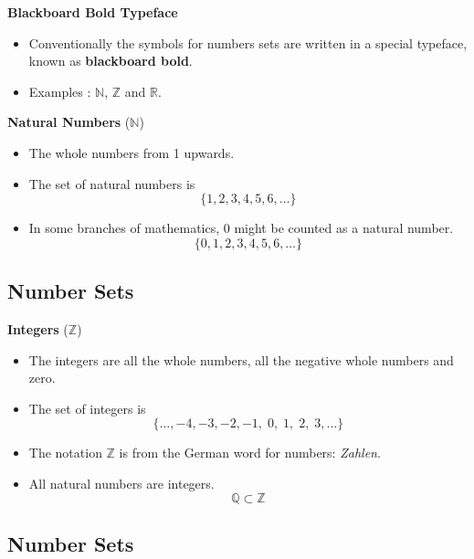 \documentclass[]{report}
\begin{document}
\textbf{Blackboard Bold Typeface}

\begin{itemize}
\item Conventionally the symbols for numbers sets are written in a special typeface, known as \textbf{blackboard bold}.
\item Examples : $\mathbb{N}$, $\mathbb{Z}$ and $\mathbb{R}$.

\end{itemize}


\textbf{Natural Numbers} ($\mathbb{N}$)
\begin{itemize}
\item The whole numbers from 1 upwards. 

\item The set of natural numbers is 
\[\{1,2,3,4,5,6,\ldots\} \]
\item In some branches of mathematics, $0$ might be counted as a natural number.
\[\{0,1,2,3,4,5,6,\ldots\} \]
\end{itemize}



\subsection{Number Sets}


\textbf{Integers} ($\mathbb{Z}$)
\begin{itemize}
\item The integers are all the whole numbers, all the negative whole numbers and zero.

\item The set of integers is 
\[\{\ldots,-4,-3,-2,-1,\;0,\;1,\;2,\;3,\ldots\} \]
\item The notation $\mathbb{Z}$ is from the German word for numbers: \textit{Zahlen}. 
\item All natural numbers are integers.
\[ \mathbb{Q}  \subset \mathbb{Z}\]
\end{itemize}



\subsection{Number Sets}
\end{document}
